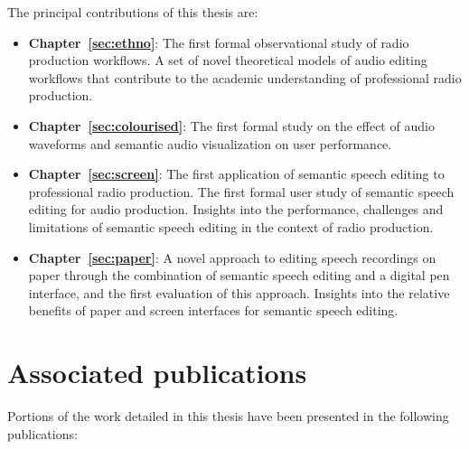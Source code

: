 

The principal contributions of this thesis are:
\begin{itemize}
  \item \textbf{Chapter~\ref{sec:ethno}}: 
    The first formal observational study of radio production workflows. A set of novel theoretical models of audio
    editing workflows that contribute to the academic understanding of professional radio production.
  \item \textbf{Chapter~\ref{sec:colourised}}: 
    The first formal study on the effect of audio waveforms and semantic audio visualization on user performance.
  \item \textbf{Chapter~\ref{sec:screen}}: 
    The first application of semantic speech editing to professional radio production.  The first formal user study of
    semantic speech editing for audio production. Insights into the performance, challenges and limitations of semantic
    speech editing in the context of radio production. 
  \item \textbf{Chapter~\ref{sec:paper}}:
    A novel approach to editing speech recordings on paper through the combination of semantic speech editing and a
    digital pen interface, and the first evaluation of this approach. Insights into the relative benefits of paper and
    screen interfaces for semantic speech editing.
\end{itemize}

\section{Associated publications}\label{sec:intro-publications}

Portions of the work detailed in this thesis have been presented in the following publications:

